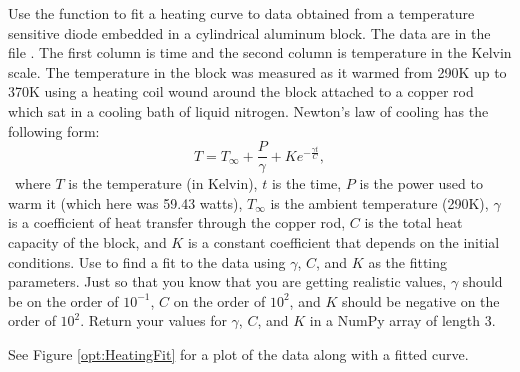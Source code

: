 \begin{problem}
Use the  function to fit a heating curve to data obtained from a temperature sensitive diode embedded in a cylindrical aluminum block.
The data are in the file . The first column is time and the second column is temperature in the Kelvin scale.
The temperature in the block was measured as it warmed from 290K up to 370K using a heating coil wound around the block attached to a
copper rod which sat in a cooling bath of liquid nitrogen.
Newton's law of cooling has the following form:
\[
T = T_{\infty} + \frac{P}{\gamma}+Ke^{-\frac{\gamma t}{C}},
\]\
where $T$ is the temperature (in Kelvin), $t$ is the time, $P$ is the power used to warm it (which here was 59.43 watts),
$T_{\infty}$ is the ambient temperature (290K), $\gamma$ is a coefficient of heat transfer through the copper rod,
$C$ is the total heat capacity of the block, and $K$ is a constant coefficient that depends on the initial conditions.
Use \li{opt.curve_fit} to find a fit to the data using $\gamma$, $C$, and $K$ as the fitting parameters.
Just so that you know that you are getting realistic values, $\gamma$ should be on the order of $10^{-1}$, $C$ on the order of $10^{2}$, and $K$ should be negative on the order of $10^{2}$.
Return your values for $\gamma$, $C$, and $K$ in a NumPy array of length 3.

See Figure \ref{opt:HeatingFit} for a plot of the data along with a fitted curve.

\end{problem}


